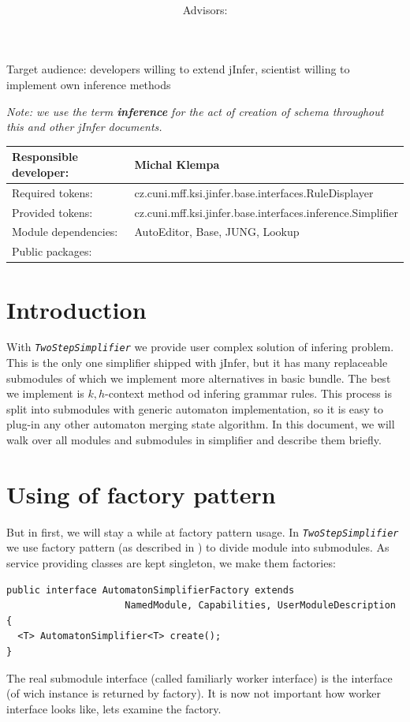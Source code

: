 \documentclass[a4paper,10pt,oneside]{article}
\title{\bf\mftitle}
\author{\mfauthor \\ Advisors: \mfadvisor}
\date{\mfplacedate}
\newcommand{\code}[1]{\texttt{\StrSubstitute{#1}{.}{.\.}}}
\def\.{\discretionary{}{}{}}
\newcommand{\jmodule}[1]{\texttt{\textit{#1}}}
\begin{document}
\maketitle
\noindent Target audience: developers willing to extend jInfer, scientist willing to implement own inference methods

\noindent \emph{Note: we use the term \textbf{inference} for the act of creation of schema throughout this and other jInfer documents.}

\noindent \begin{tabular}{|l|l|} \hline
Responsible developer: & Michal Klempa \\ \hline
Required tokens:       & cz.cuni.mff.ksi.jinfer.base.interfaces.RuleDisplayer \\ \hline
Provided tokens:       & cz.cuni.mff.ksi.jinfer.base.interfaces.inference.Simplifier \\ \hline
Module dependencies:   & AutoEditor, Base, JUNG, Lookup \\ \hline
Public packages:       & \\ \hline
\end{tabular}

\section{Introduction}
With \jmodule{TwoStepSimplifier} we provide user complex solution of infering problem.
This is the only one simplifier shipped with jInfer, but it has many replaceable submodules of which we implement more alternatives in basic bundle.
The best we implement is \cite{ahonen} $k,h$-context method od infering grammar rules.
This process is split into submodules with generic automaton implementation, so it is easy to plug-in any other automaton merging state algorithm.
In this document, we will walk over all modules and submodules in simplifier and describe them briefly.

\section{Using of factory pattern} \label{section_factory}
But in first, we will stay a while at factory pattern usage.
In \jmodule{TwoStepSimplifier} we use factory pattern (as described in \cite{archdoc}) to divide module into submodules.
As service providing classes are kept singleton, we make them factories:
\begin{verbatim}
public interface AutomatonSimplifierFactory extends 
                     NamedModule, Capabilities, UserModuleDescription {
  <T> AutomatonSimplifier<T> create();
}
\end{verbatim}
The real submodule interface (called familiarly worker interface) is the \code{AutomatonSimplifier<T>} interface (of wich instance is returned by factory). It is now not important how worker interface looks like, lets examine the factory.
\end{document}
